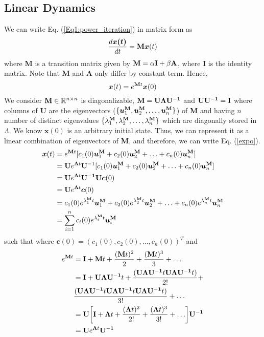 \documentclass[aps, prd, showpacs, floatfix, superscriptaddress, twocolumn, nofootinbib, preprintnumbers, longbibliography]{revtex4-2}
\begin{document}
\subsection{Linear Dynamics}
We can write Eq. (\ref{Eq1:power_iteration}) in matrix form as
\begin{equation}
\frac{d\bm{x(t)}}{dt}={\bf M}\bm{x}(t)
\end{equation}
where {\bf M} is a transition matrix given by ${\bf M} =  \alpha{\bf I}+\beta{\bf A} $, where {\bf I} is the identity matrix. Note that {\bf M} and {\bf A} only differ by constant term. Hence,
\begin{equation}
\label{expo}
\bm{x}(t) = e^{{\bf M}t}\bm{x}(0)
\end{equation}
We consider ${\bf M}\in \mathbb{R}^{n \times n}$ is diagonalizable, ${\bf M}={\bf U \Lambda U^{-1}}$ and ${\bf U U^{-1}}={\bf I}$ where columns of {\bf U} are the eigenvectors ($\{\bm{u}_1^{\bf M},\bm{u}_2^{\bf M},\ldots,\bm{u}_n^{\bf M}\}$) of {\bf M} and having $n$ number of distinct eigenvalues $\{\lambda_1^{\bf M},\lambda_2^{\bf M},\ldots,\lambda_n^{\bf M}\}$ which are diagonally stored in $\Lambda$. We know $\bm{x}(0)$ is an arbitrary initial state. Thus, we can represent it as a linear combination of eigenvectors of {\bf M}, and therefore, we can write Eq. (\ref{expo}).
%
\begin{equation}
\label{perturbation_propagation}
\begin{split}
\bm{x}(t) & =  e^{{\bf M}t}[c_1(0)\bm{u}_1^{\bf M}+c_2(0)\bm{u}_2^{\bf M}+\ldots+c_n(0)\bm{u}_n^{\bf M}]\\
          & =  {\bf U}e^{{\bf \Lambda}t}{\bf U}^{-1}[c_1(0)\bm{u}_1^{\bf M}+c_2(0)\bm{u}_2^{\bf M}+\ldots+c_n(0)\bm{u}_n^{\bf M}]\\
          & =  {\bf U}e^{{\bf \Lambda}t}{\bf U^{-1}}{\bf U}\bm{c}(0)\\
          & =  {\bf U}e^{{\bf \Lambda}t}\bm{c}(0)\\
          & = c_1(0) e^{\lambda_1^{\bf M}t}\bm{u}_1^{\bf M} + c_2(0) e^{\lambda_2^{\bf M}t}\bm{u}_2^{\bf M} + \ldots+c_n(0) e^{\lambda_n^{\bf M}t}\bm{u}_n^{\bf M}\\
          &=\sum_{i=1}^{n}c_i(0)e^{\lambda_i^{\bf M}t}\bm{u}_i^{\bf M}
\end{split}
\end{equation}
%
such that where $\bm{c}(0)=(c_1(0),c_2(0),\ldots,c_n(0))^{T}$ and 
\begin{equation}
\begin{split}
e^{{\bf M}t} & =  {\bf I}+{\bf M}t+\frac{({\bf M}t)^2}{2}+\frac{({\bf M}t)^3}{3}+\ldots\\
             &=  {\bf I}+{\bf U \Lambda U^{-1}}t+\frac{({\bf U \Lambda U^{-1}}t{\bf U \Lambda U^{-1}}t)}{2!}+\\
             &\frac{({\bf U \Lambda U^{-1}}t{\bf U \Lambda U^{-1}}t{\bf U \Lambda U^{-1}}t)}{3!}+\ldots\\
             &=  {\bf U}\biggl[{\bf I}+{\bf \Lambda}t+\frac{({\bf  \Lambda} t)^2}{2!}+\frac{({\bf \Lambda} t)^3}{3!}+\ldots\biggr]{\bf U^{-1}}\\
             & ={\bf U}e^{{\bf \Lambda}t}{\bf U^{-1}}
\end{split}
\end{equation}
\end{document}

